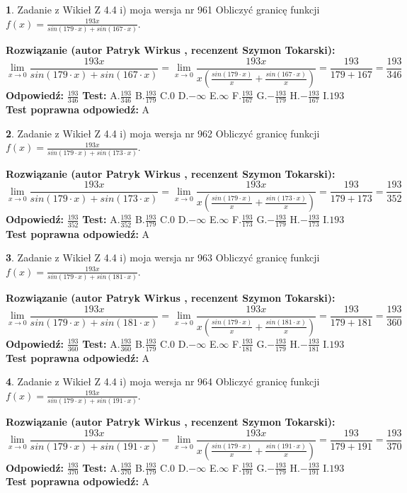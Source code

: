 \documentclass[12pt, a4paper]{article}
\theoremstyle{definition} %
\newtheorem{zad}{}
\newcommand{\zadStart}[1]{\begin{zad}#1\newline}
\newcommand{\zadStop}{\end{zad}}
\newcommand{\rozwStart}[2]{\noindent \textbf{Rozwiązanie (autor #1 , recenzent #2): }\newline}
\newcommand{\rozwStop}{\newline}
\newcommand{\odpStart}{\noindent \textbf{Odpowiedź:}\newline}
\newcommand{\odpStop}{\newline}
\newcommand{\testStart}{\noindent \textbf{Test:}\newline}
\newcommand{\testStop}{\newline}
\newcommand{\kluczStart}{\noindent \textbf{Test poprawna odpowiedź:}\newline}
\newcommand{\kluczStop}{\newline}
\begin{document}
\zadStart{Zadanie z Wikieł Z 4.4 i) moja wersja nr 961}
Obliczyć granicę funkcji $f(x)=\frac{193x}{sin(179\cdot x) +sin(167\cdot x)}$.
\zadStop
\rozwStart{Patryk Wirkus}{Szymon Tokarski}
$$\lim\limits_{x\to 0}\frac{193x}{sin(179\cdot x) +sin(167\cdot x)}=\lim\limits_{x\to 0}\frac{193x}{x(\frac{sin(179\cdot x)}{x}+\frac{sin(167\cdot x)}{x})}=\frac{193}{179+167} = \frac{193}{346}$$
\rozwStop
\odpStart
$\frac{193}{346}$
\odpStop
\testStart
A.$\frac{193}{346}$
B.$\frac{193}{179}$
C.$0$
D.$-\infty$
E.$\infty$
F.$\frac{193}{167}$
G.$-\frac{193}{179}$
H.$-\frac{193}{167}$
I.$193$
\testStop
\kluczStart
A
\kluczStop



\zadStart{Zadanie z Wikieł Z 4.4 i) moja wersja nr 962}
Obliczyć granicę funkcji $f(x)=\frac{193x}{sin(179\cdot x) +sin(173\cdot x)}$.
\zadStop
\rozwStart{Patryk Wirkus}{Szymon Tokarski}
$$\lim\limits_{x\to 0}\frac{193x}{sin(179\cdot x) +sin(173\cdot x)}=\lim\limits_{x\to 0}\frac{193x}{x(\frac{sin(179\cdot x)}{x}+\frac{sin(173\cdot x)}{x})}=\frac{193}{179+173} = \frac{193}{352}$$
\rozwStop
\odpStart
$\frac{193}{352}$
\odpStop
\testStart
A.$\frac{193}{352}$
B.$\frac{193}{179}$
C.$0$
D.$-\infty$
E.$\infty$
F.$\frac{193}{173}$
G.$-\frac{193}{179}$
H.$-\frac{193}{173}$
I.$193$
\testStop
\kluczStart
A
\kluczStop



\zadStart{Zadanie z Wikieł Z 4.4 i) moja wersja nr 963}
Obliczyć granicę funkcji $f(x)=\frac{193x}{sin(179\cdot x) +sin(181\cdot x)}$.
\zadStop
\rozwStart{Patryk Wirkus}{Szymon Tokarski}
$$\lim\limits_{x\to 0}\frac{193x}{sin(179\cdot x) +sin(181\cdot x)}=\lim\limits_{x\to 0}\frac{193x}{x(\frac{sin(179\cdot x)}{x}+\frac{sin(181\cdot x)}{x})}=\frac{193}{179+181} = \frac{193}{360}$$
\rozwStop
\odpStart
$\frac{193}{360}$
\odpStop
\testStart
A.$\frac{193}{360}$
B.$\frac{193}{179}$
C.$0$
D.$-\infty$
E.$\infty$
F.$\frac{193}{181}$
G.$-\frac{193}{179}$
H.$-\frac{193}{181}$
I.$193$
\testStop
\kluczStart
A
\kluczStop



\zadStart{Zadanie z Wikieł Z 4.4 i) moja wersja nr 964}
Obliczyć granicę funkcji $f(x)=\frac{193x}{sin(179\cdot x) +sin(191\cdot x)}$.
\zadStop
\rozwStart{Patryk Wirkus}{Szymon Tokarski}
$$\lim\limits_{x\to 0}\frac{193x}{sin(179\cdot x) +sin(191\cdot x)}=\lim\limits_{x\to 0}\frac{193x}{x(\frac{sin(179\cdot x)}{x}+\frac{sin(191\cdot x)}{x})}=\frac{193}{179+191} = \frac{193}{370}$$
\rozwStop
\odpStart
$\frac{193}{370}$
\odpStop
\testStart
A.$\frac{193}{370}$
B.$\frac{193}{179}$
C.$0$
D.$-\infty$
E.$\infty$
F.$\frac{193}{191}$
G.$-\frac{193}{179}$
H.$-\frac{193}{191}$
I.$193$
\testStop
\kluczStart
A
\kluczStop
\end{document}
